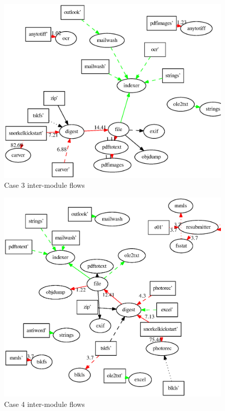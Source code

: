 \begin{figure}
  \centering
  \includegraphics[width=130mm]{ocfa/step5/stripped3_modules.eps}
  \caption{Case 3 inter-module flows}
\end{figure}
\begin{figure}
  \centering
  \includegraphics[width=130mm]{ocfa/step5/stripped4_modules.eps}
  \caption{Case 4 inter-module flows}
\end{figure}
